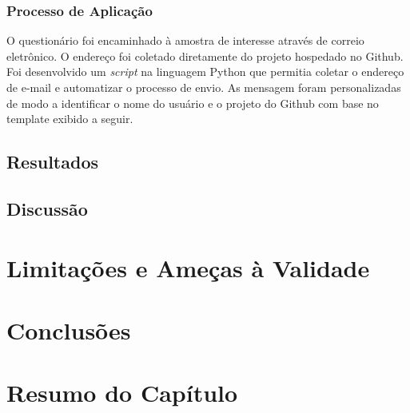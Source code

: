 
\subsubsection{Processo de Aplicação}
\label{ssub:processo_de_aplicação}

O questionário foi encaminhado à amostra de interesse através de correio
eletrônico. O endereço foi coletado diretamente do projeto hospedado no Github.
Foi desenvolvido um \textit{script} na linguagem Python que permitia coletar o
endereço de e-mail e automatizar o processo de envio. As mensagem foram
personalizadas de modo a identificar o nome do usuário e o projeto do Github com
base no template exibido a seguir.


\subsection{Resultados}
\label{sub:implementacao_extensao_avaliacao_resultados}

\subsection{Discussão}
\label{sub:implemtacao_extensao_avaliacao_discussao}

\section{Limitações e Ameças à Validade}
\label{sec:limitações_e_ameças_à_validade}

\section{Conclusões}
\label{sec:conclusões}

\section{Resumo do Capítulo}
\label{sec:implemtacao_extensao_resumo}
